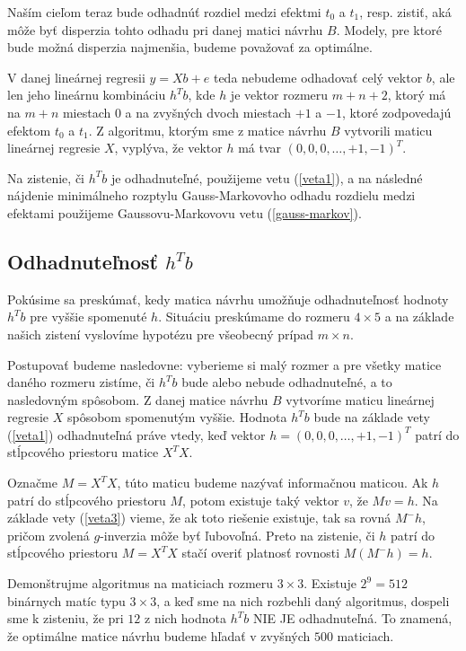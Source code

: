 Naším cieľom teraz bude odhadnúť rozdiel medzi efektmi $t_0$ a $t_1$, resp. zistiť, 
aká môže byť disperzia tohto odhadu pri danej matici návrhu $B$. 
Modely, pre ktoré bude možná disperzia najmenšia, budeme považovať za optimálne.

V danej lineárnej regresii $y = X b + e$ teda nebudeme odhadovať celý vektor $b$, 
ale len jeho lineárnu kombináciu $h^T b$, kde $h$ je vektor rozmeru $m + n + 2$, 
ktorý má na $m + n$ miestach $0$ a na zvyšných dvoch miestach $+1$ a $-1$, ktoré zodpovedajú efektom $t_0$ a $t_1$. 
Z algoritmu, ktorým sme z matice návrhu $B$ vytvorili maticu lineárnej regresie $X$, 
vyplýva, že vektor $h$ má tvar $(0, 0, 0, \ldots, +1, -1)^T$.

Na zistenie, či $h^T b$ je odhadnuteľné, použijeme vetu (\ref{veta1}), 
a na následné nájdenie minimálneho rozptylu Gauss-Markovovho odhadu rozdielu medzi efektami 
použijeme Gaussovu-Markovovu vetu (\ref{gauss-markov}).

\subsection{Odhadnuteľnosť $h^T b$}

Pokúsime sa preskúmať, kedy matica návrhu umožňuje odhadnuteľnosť hodnoty $h^T b$ pre vyššie spomenuté $h$. 
Situáciu preskúmame do rozmeru $4 \times 5$ a na základe našich zistení vyslovíme hypotézu pre všeobecný prípad $m \times n$.

Postupovať budeme nasledovne: vyberieme si malý rozmer a pre všetky matice daného rozmeru zistíme, 
či $h^T b$ bude alebo nebude odhadnuteľné, a to nasledovným spôsobom. 
Z danej matice návrhu $B$ vytvoríme maticu lineárnej regresie $X$ spôsobom spomenutým vyššie. 
Hodnota $h^T b$ bude na základe vety (\ref{veta1}) odhadnuteľná práve vtedy, 
keď vektor $h = (0, 0, 0, \ldots, +1, -1)^T$ patrí do stĺpcového priestoru matice $X^T X$.

Označme $M = X^T X$, túto maticu budeme nazývať informačnou maticou. 
Ak $h$ patrí do stĺpcového priestoru $M$, potom existuje taký vektor $v$, že $M v = h$. 
Na základe vety (\ref{veta3}) vieme, že ak toto riešenie existuje, tak sa rovná $M^- h$, pričom zvolená $g$-inverzia môže byť ľubovoľná.
Preto na zistenie, či $h$ patrí do stĺpcového priestoru $M = X^T X$ stačí overiť platnosť rovnosti $M(M^- h) = h$. 

Demonštrujme algoritmus na maticiach rozmeru $3 \times 3$. Existuje $2^9 = 512$ binárnych matíc typu $3 \times 3$, 
a keď sme na nich rozbehli daný algoritmus, dospeli sme k zisteniu, že pri $12$ z nich hodnota $h^T b$ NIE JE odhadnuteľná.
To znamená, že optimálne matice návrhu budeme hľadať v zvyšných $500$ maticiach.

